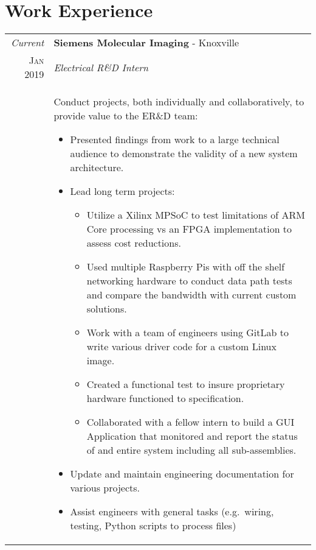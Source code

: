 \documentclass[a4paper,11pt]{article}
\begin{document}
\section{Work Experience}
\begin{tabularx}{\textwidth}{r|X}
   \emph{Current} & \textbf{Siemens Molecular Imaging} \-- Knoxville\\
   \textsc{Jan 2019} & \emph{Electrical R\&D Intern}\\
   & \small{Conduct projects, both individually and collaboratively, to provide value to the ER\&D team:
      \begin{itemize}[leftmargin=20pt,topsep=1pt,itemsep=1pt,partopsep=0pt, parsep=1pt]
         \item Presented findings from work to a large technical audience to demonstrate the validity of a new system architecture.
         \item Lead long term projects:
            \begin{itemize}[leftmargin=20pt,topsep=1pt,itemsep=1pt,partopsep=0pt, parsep=1pt]
               \item Utilize a Xilinx MPSoC to test limitations of ARM Core processing vs an FPGA implementation to assess cost reductions.
               \item Used multiple Raspberry Pis with off the shelf networking hardware to conduct data path tests and compare the bandwidth with current custom solutions.
               \item Work with a team of engineers using GitLab to write various driver code for a custom Linux image.
               \item Created a functional test to insure proprietary hardware functioned to specification.
               \item Collaborated with a fellow intern to build a GUI Application that monitored and report the status of and entire system including all sub-assemblies.
            \end{itemize}
         \item Update and maintain engineering documentation for various projects.
         \item Assist engineers with general tasks (e.g.\ wiring, testing, Python scripts to process files)
      \vspace{-0.5cm}
      \end{itemize}}\\
\end{tabularx}
\end{document}
